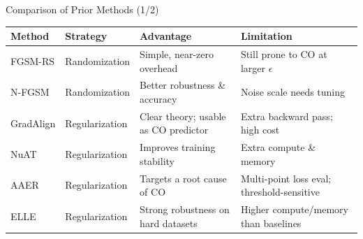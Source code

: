 \documentclass[11pt,aspectratio=169]{beamer}
\begin{document}
\begin{frame}{Comparison of Prior Methods (1/2)}
  \begin{table}
  \centering
  \label{tab:comparison_prior_works}
  \vskip 0.15cm
  \scriptsize
  \renewcommand{\arraystretch}{1.5}
  \setlength{\tabcolsep}{6pt}
  \begin{tabular}{|p{1.8cm}|p{1.8cm}|p{3.6cm}|p{3.6cm}|}
  \hline
  \textbf{Method} & \textbf{Strategy} & \textbf{Advantage} & \textbf{Limitation} \\
  \hline
  FGSM-RS \cite{wong2020fast} & Randomization & Simple, near-zero overhead & Still prone to CO at larger $\epsilon$ \\
  \hline
  N-FGSM \cite{dejorge2022make} & Randomization & Better robustness \& accuracy & Noise scale needs tuning \\
  \hline
  GradAlign \cite{andriushchenko2020understanding} & Regularization & Clear theory; usable as CO predictor & Extra backward pass; high cost \\
  \hline
  NuAT \cite{sriramanan2021towards} & Regularization & Improves training stability & Extra compute \& memory \\
  \hline
  AAER \cite{lin2023eliminating} & Regularization & Targets a root cause of CO & Multi-point loss eval; threshold-sensitive \\
  \hline
  ELLE \cite{rocamora2024efficient} & Regularization & Strong robustness on hard datasets & Higher compute/memory than baselines \\
  \hline
  \end{tabular}
  \end{table}
\end{frame}
\end{document}
